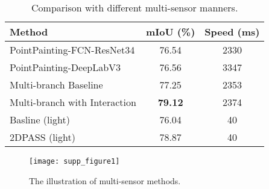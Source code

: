 \documentclass[runningheads]{llncs}
\begin{document}
	\begin{table*}[t]
		\footnotesize
		\vspace{-0.2cm}
		\begin{tabular}{l|cc}
			\hline
			Method & mIoU (\%)  & Speed (ms)\\
			\hline
			PointPainting-FCN-ResNet34 & 76.54  & 2330 \\
			PointPainting-DeepLabV3 & 76.56  & 3347 \\
			Multi-branch Baseline & 77.25  & 2353 \\
			Multi-branch with Interaction & \textbf{79.12}  &  2374 \\\hline
			Basline (light) & 76.04  & 40 \\	
			2DPASS (light) & 78.87  & 40 \\
			\hline
		\end{tabular}\vspace{-0.2cm}
		\caption{Comparison with different multi-sensor manners.}
		\label{tab:ablation1supp}
		
		
	\end{table*}

	\begin{figure*}[t]
		\begin{centering}
			\texttt{[image: supp\_figure1]}
			
\caption{{The illustration of multi-sensor methods.\vspace{-.6cm}} 
			}
			\label{fig:supp_figure1}
		\end{centering}	
	
	\end{figure*}
	

	
	
\end{document}
